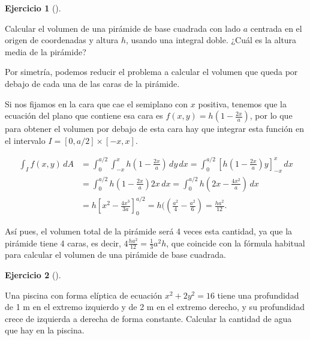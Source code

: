 \documentclass[
  spanish,
  a4paper,
]{scrreport}
\theoremstyle{definition}
\newtheorem{exercise}{Ejercicio}[chapter]
\theoremstyle{remark}
\begin{document}
\begin{exercise}[]\protect\hypertarget{exr-volumen-piramide}{}\label{exr-volumen-piramide}

Calcular el volumen de una pirámide de base cuadrada con lado \(a\)
centrada en el origen de coordenadas y altura \(h\), usando una integral
doble. ¿Cuál es la altura media de la pirámide?

\end{exercise}

\begin{tcolorbox}[enhanced jigsaw, arc=.35mm, bottomrule=.15mm, bottomtitle=1mm, breakable, colback=white, colbacktitle=quarto-callout-tip-color!10!white, colframe=quarto-callout-tip-color-frame, coltitle=black, left=2mm, leftrule=.75mm, opacityback=0, opacitybacktitle=0.6, rightrule=.15mm, title=\textcolor{quarto-callout-tip-color}{\faLightbulb}\hspace{0.5em}{Solución}, titlerule=0mm, toprule=.15mm, toptitle=1mm]

Por simetría, podemos reducir el problema a calcular el volumen que
queda por debajo de cada una de las caras de la pirámide.

Si nos fijamos en la cara que cae el semiplano con \(x\) positiva,
tenemos que la ecuación del plano que contiene esa cara es
\(f(x,y) = h\left(1 - \frac{2x}{a}\right)\), por lo que para obtener el
volumen por debajo de esta cara hay que integrar esta función en el
intervalo \(I=[0, a/2]\times[-x,x]\).

\begin{align*}
\int_I f(x,y) \,dA 
&= \int_0^{a/2} \int_{-x}^x h\left(1 - \frac{2x}{a}\right)\,dy\,dx 
= \int_0^{a/2} \left[h\left(1 - \frac{2x}{a}\right)y\right]_{-x}^x\,dx \\
&= \int_0^{a/2} h\left(1 - \frac{2x}{a}\right)2x\,dx 
= \int_0^{a/2} h\left(2x - \frac{4x^2}{a}\right)\,dx \\
&= h\left[x^2-\frac{4x^3}{3a}\right]_0^{a/2}
= h(\left(\frac{a^2}{4}-\frac{a^2}{6}\right) 
= \frac{ha^2}{12}.
\end{align*}

Así pues, el volumen total de la pirámide será 4 veces esta cantidad, ya
que la pirámide tiene 4 caras, es decir,
\(4\frac{ha^2}{12} = \frac{1}{3}a^2h\), que coincide con la fórmula
habitual para calcular el volumen de una pirámide de base cuadrada.

\end{tcolorbox}

\begin{exercise}[]\protect\hypertarget{exr-volumen-piscina}{}\label{exr-volumen-piscina}

Una piscina con forma elíptica de ecuación \(x^2+2y^2 = 16\) tiene una
profundidad de 1 m en el extremo izquierdo y de 2 m en el extremo
derecho, y su profundidad crece de izquierda a derecha de forma
constante. Calcular la cantidad de agua que hay en la piscina.

\end{exercise}
\end{document}
